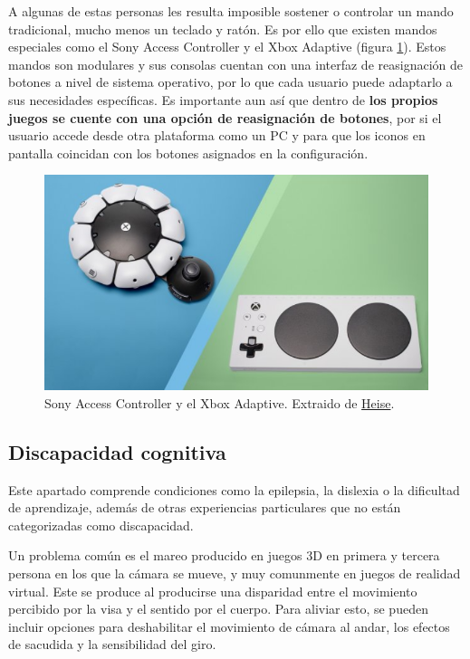 A algunas de estas personas les resulta imposible sostener o controlar un mando tradicional, mucho menos un teclado y ratón. Es por ello que existen mandos especiales como el Sony Access Controller y el Xbox Adaptive (figura \ref{fig:controllers}). Estos mandos son modulares y sus consolas cuentan con una interfaz de reasignación de botones a nivel de sistema operativo, por lo que cada usuario puede adaptarlo a sus necesidades específicas. Es importante aun así que dentro de \textbf{los propios juegos se cuente con una opción de reasignación de botones}, por si el usuario accede desde otra plataforma como un PC y para que los iconos en pantalla coincidan con los botones asignados en la configuración.

\begin{figure}[h]
    \centering
    \includegraphics[scale=0.48]{img/accesible-controls.png}
    \caption[Sony Access Controller y el Xbox Adaptive]{Sony Access Controller y el Xbox Adaptive. Extraido de \href{https://www.heise.de/tests/Sony-Access-und-Xbox-Adaptive-Barrierefreie-Gaming-Controller-im-Vergleich-9645431.html}{Heise}.}
    \label{fig:controllers}
\end{figure}

\subsection{Discapacidad cognitiva}

Este apartado comprende condiciones como la epilepsia, la dislexia o la dificultad de aprendizaje, además de otras experiencias particulares que no están categorizadas como discapacidad.

Un problema común es el mareo producido en juegos 3D en primera y tercera persona en los que la cámara se mueve, y muy comunmente en juegos de realidad virtual. Este se produce al producirse una disparidad entre el movimiento percibido por la visa y el sentido por el cuerpo. Para aliviar esto, se pueden incluir opciones para deshabilitar el movimiento de cámara al andar, los efectos de sacudida y la sensibilidad del giro.

